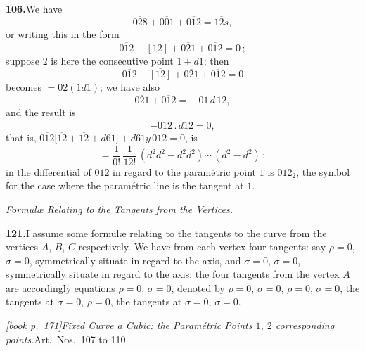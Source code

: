 \documentclass[11pt,a4paper]{article}
\begin{document}
\medskip\noindent\textbf{106.}\quad We have
\[
\overline{028} + \overline{001} + \overline{012} = \overline{12s},
\]
or writing this in the form
\[
\overline{012} - \overline{[12]} + \overline{021} + \overline{012} = 0\,;
\]
suppose $2$ is here the consecutive point $1 + d1$; then
\[
\overline{012} - \overline{[12]} + \overline{021} + \overline{012} = 0
\]
becomes $= 02(1 d 1)$; we have also
\[
\overline{021} + \overline{012} = -\,01\,d\,12,
\]
and the result is
\[
-\overline{012}\,.\,d\overline{12} = 0,
\]
that is, $\overline{012}\bigl[\overline{12} + \overline{12} + d 6 1\bigr] + d 6 1y\,012 = 0$, is
\[
= \frac{1}{0!}\,\frac{1}{12!}\,(d^2 d^2 - d^2 d^2) \cdots\,(d^2 - d^2)\,;
\]
in the differential of $\overline{012}$ in regard to the param\'etric point $1$ is $\overline{012}_2$, the symbol for the case where the param\'etric line is the tangent at $1$.

\medskip\noindent\textit{Formul\ae{} Relating to the Tangents from the Vertices.}

\medskip\noindent\textbf{121.}\quad I assume some formul\ae{} relating to the tangents to the curve from the vertices $A$, $B$, $C$ respectively. We have from each vertex four tangents: say $\rho = 0$, $\sigma = 0$, symmetrically situate in regard to the axis, and $\sigma = 0$, $\sigma = 0$, symmetrically situate in regard to the axis: the four tangents from the vertex $A$ are accordingly equations $\rho = 0$, $\sigma = 0$, denoted by $\rho = 0$, $\sigma = 0$, $\rho = 0$, $\sigma = 0$, the tangents at $\sigma = 0$, $\rho = 0$, the tangents at $\sigma = 0$, $\sigma = 0$.

\medskip\noindent\textit{[book p.~171]}\quad \textit{Fixed Curve a Cubic: the Param\'etric Points $1$, $2$ corresponding points.}\quad Art.\ Nos.\ 107 to 110.
\end{document}
